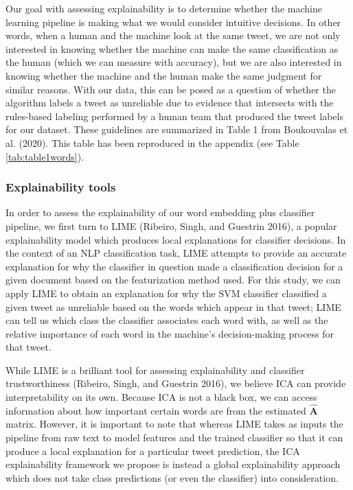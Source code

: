 \documentclass{article}
\begin{document}
Our goal with assessing explainability is to determine whether the
machine learning pipeline is making what we would consider intuitive
decisions. In other words, when a human and the machine look at the same
tweet, we are not only interested in knowing whether the machine can
make the same classification as the human (which we can measure with
accuracy), but we are also interested in knowing whether the machine and
the human make the same judgment for similar reasons. With our data,
this can be posed as a question of whether the algorithm labels a tweet
as unreliable due to evidence that intersects with the rules-based
labeling performed by a human team that produced the tweet labels for
our dataset. These guidelines are summarized in Table 1 from Boukouvalas
et al. (2020). This table has been reproduced in the appendix (see Table
\ref{tab:table1words}).

\hypertarget{explainability-tools}{%
\subsubsection{Explainability tools}\label{explainability-tools}}

In order to assess the explainability of our word embedding plus
classifier pipeline, we first turn to LIME (Ribeiro, Singh, and Guestrin
2016), a popular explainability model which produces local explanations
for classifier decisions. In the context of an NLP classification task,
LIME attempts to provide an accurate explanation for why the classifier
in question made a classification decision for a given document based on
the featurization method used. For this study, we can apply LIME to
obtain an explanation for why the SVM classifier classified a given
tweet as unreliable based on the words which appear in that tweet; LIME
can tell us which class the classifier associates each word with, as
well as the relative importance of each word in the machine's
decision-making process for that tweet.

While LIME is a brilliant tool for assessing explainability and
classifier trustworthiness (Ribeiro, Singh, and Guestrin 2016), we
believe ICA can provide interpretability on its own. Because ICA is not
a black box, we can access information about how important certain words
are from the estimated \(\mathbf{\hat{A}}\) matrix. However, it is
important to note that whereas LIME takes as inputs the pipeline from
raw text to model features and the trained classifier so that it can
produce a local explanation for a particular tweet prediction, the ICA
explainability framework we propose is instead a global explainability
approach which does not take class predictions (or even the classifier)
into consideration.
\end{document}
